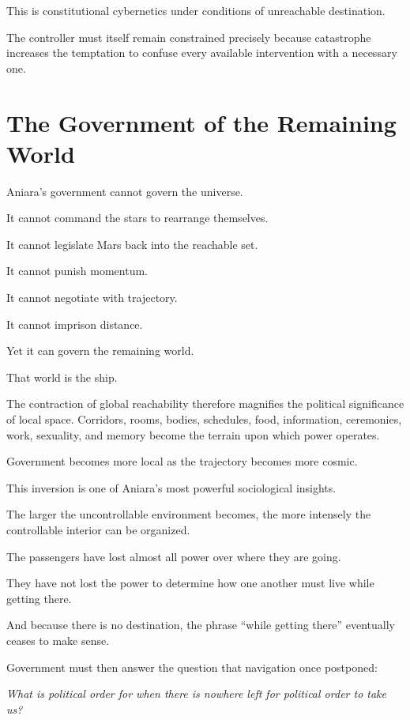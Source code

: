 \documentclass[11pt,oneside]{book}
\theoremstyle{definition}
\theoremstyle{remark}
\begin{document}
This is constitutional cybernetics under conditions of unreachable destination.

The controller must itself remain constrained precisely because catastrophe increases the temptation to confuse every available intervention with a necessary one.

\section{The Government of the Remaining World}

Aniara's government cannot govern the universe.

It cannot command the stars to rearrange themselves.

It cannot legislate Mars back into the reachable set.

It cannot punish momentum.

It cannot negotiate with trajectory.

It cannot imprison distance.

Yet it can govern the remaining world.

That world is the ship.

The contraction of global reachability therefore magnifies the political significance of local space. Corridors, rooms, bodies, schedules, food, information, ceremonies, work, sexuality, and memory become the terrain upon which power operates.

Government becomes more local as the trajectory becomes more cosmic.

This inversion is one of Aniara's most powerful sociological insights.

The larger the uncontrollable environment becomes, the more intensely the controllable interior can be organized.

The passengers have lost almost all power over where they are going.

They have not lost the power to determine how one another must live while getting there.

And because there is no destination, the phrase ``while getting there'' eventually ceases to make sense.

Government must then answer the question that navigation once postponed:

\begin{center}
\emph{What is political order for when there is nowhere left for political order to take us?}
\end{center}
\end{document}
